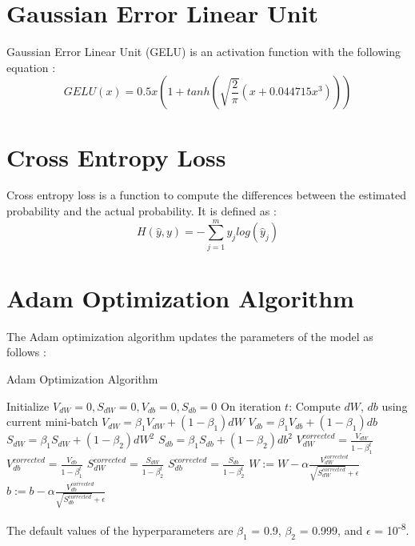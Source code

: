 \section{Gaussian Error Linear Unit}
Gaussian Error Linear Unit (GELU) is an activation function with the following equation \cite{hansen_2019}:
\begin{equation}
\label{eq:2.23}
GELU(x) = 0.5 x \left( 1 + tanh \left(\sqrt{\frac{2}{\pi}}(x + 0.044715x^3)\right)\right)
\end{equation}

\section{Cross Entropy Loss}
Cross entropy loss is a function to compute the differences between the estimated probability and the actual probability. It is defined as \cite{manning2019cs224n}:
\begin{equation}
\label{eq:24}
H(\hat{y}, y) = - \sum _{j = 1} ^{m} y_j log(\hat{y}_j)
\end{equation}

\section{Adam Optimization Algorithm}
The Adam optimization algorithm updates the parameters of the model as follows \cite{ng}:
\begin{algorithm}[H]
\caption{Adam Optimization Algorithm}
\begin{algorithmic}[1]
\State Initialize $V_{dW} = 0, S_{dW} = 0, V_{db} = 0, S_{db} = 0$ 
\State On iteration $t$:
\State \hspace{6mm} Compute $dW$, $db$ using current mini-batch
\State \hspace{6mm} $V_{dW} = \beta_1 V_{dW} + (1 - \beta_1)dW $
\State \hspace{6mm} $V_{db} = \beta_1 V_{db} + (1 - \beta_1)db $
\State \hspace{6mm} $S_{dW} = \beta_1 S_{dW} + (1 - \beta_2)dW^2$
\State \hspace{6mm} $S_{db} = \beta_1 S_{db} + (1 - \beta_2)db^2$
\State \hspace{6mm} $V_{dW}^{corrected} = \frac{V_{dW}}{1 - \beta_1^t}$
\State \hspace{6mm} $V_{db}^{corrected} = \frac{V_{db}}{1 - \beta_1^t}$
\State \hspace{6mm} $S_{dW}^{corrected} = \frac{S_{dW}}{1 - \beta_2^t}$
\State \hspace{6mm} $S_{db}^{corrected} = \frac{S_{db}}{1 - \beta_2^t}$
\State \hspace{6mm} $W := W - \alpha \frac{V_{dW}^{corrected}}{\sqrt{S_{dW}^{corrected}} + \epsilon}$
\State \hspace{6mm} $b := b - \alpha \frac{V_{db}^{corrected}}{\sqrt{S_{db}^{corrected}} + \epsilon}$
\end{algorithmic}
\end{algorithm}
The default values of the hyperparameters are $\beta_1$ = 0.9, $\beta_2$ = 0.999, and $\epsilon$ = 10\textsuperscript{-8}.

